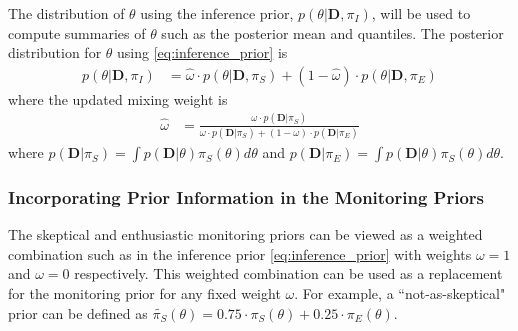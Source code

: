 \documentclass[12pt]{article}
\begin{document}
The distribution of $\theta$ using the inference 
prior, $p(\theta|\mathbf{D},\pi_I)$, will be used to compute summaries of $\theta$ such as the posterior mean and quantiles. The posterior distribution for $\theta$ using \eqref{eq:inference_prior} is
\begin{align}
p(\theta|\mathbf{D},\pi_I)&=\hat{\omega}\cdot p(\theta|\mathbf{D},\pi_S)+(1-\hat{\omega})\cdot p(\theta|\mathbf{D},\pi_E)
\end{align}
where the updated mixing weight is
\begin{align}
\hat{\omega}&=\frac{\omega\cdot p(\mathbf{D}|\pi_S)}{\omega\cdot p(\mathbf{D}|\pi_S)+(1-\omega)\cdot p(\mathbf{D}|\pi_E)}
\end{align}
where $p(\mathbf{D}|\pi_S)=\int p(\mathbf{D}|\theta)\pi_S(\theta)d\theta$ and $p(\mathbf{D}|\pi_E)=\int p(\mathbf{D}|\theta)\pi_S(\theta)d\theta$. 

%

\subsubsection{Incorporating Prior Information in the Monitoring Priors}
The skeptical and enthusiastic monitoring priors can be viewed as a weighted combination such as in the inference prior \eqref{eq:inference_prior} with weights $\omega=1$ and $\omega=0$ respectively. This weighted combination can be used as a replacement for the monitoring prior for any fixed weight $\omega$. For example, a ``not-as-skeptical" prior can be defined as $\tilde{\pi_S}(\theta)=0.75\cdot\pi_S(\theta)+0.25\cdot\pi_E(\theta)$. 
\end{document}
